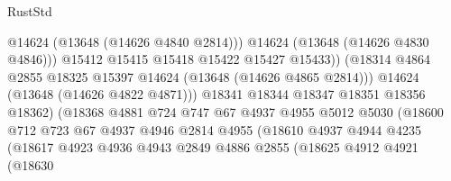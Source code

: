 \begin{lexlean}{RustStd}
\begin{coremodule}
                                            @14624
                                            (@13648 (@14626 @4840 @2814)))
                                          @14624
                                          (@13648 (@14626 @4830 @4846)))
                                        @15412
                                        @15415
                                        @15418
                                        @15422
                                        @15427
                                        @15433))
                                    (@18314
                                      @4864
                                      @2855
                                      @18325
                                      @15397
                                      @14624
                                      (@13648 (@14626 @4865 @2814)))
                                    @14624
                                    (@13648 (@14626 @4822 @4871)))
                                  @18341
                                  @18344
                                  @18347
                                  @18351
                                  @18356
                                  @18362)
                                (@18368
                                  @4881
                                  @724
                                  @747
                                  @67
                                  @4937
                                  @4955
                                  @5012
                                  @5030
                                  (@18600
                                    @712
                                    @723
                                    @67
                                    @4937
                                    @4946
                                    @2814
                                    @4955
                                    (@18610
                                      @4937
                                      @4944
                                      @4235
                                      (@18617
                                        @4923
                                        @4936
                                        @4943
                                        @2849
                                        @4886
                                        @2855
                                        (@18625
                                          @4912
                                          @4921
                                          (@18630

\end{coremodule}
\end{lexlean}
